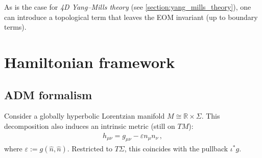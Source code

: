     As is the case for \textit{4D Yang--Mills theory} (see \cref{section:yang_mills_theory}), one can introduce a topological term that leaves the EOM invariant (up to boundary terms).

\section{Hamiltonian framework}\label{section:GR_hamiltonian_framework}
\subsection{ADM formalism}

    Consider a globally hyperbolic Lorentzian manifold $M\cong\mathbb{R}\times\Sigma$. This decomposition also induces an intrinsic metric (still on $TM$):
    \begin{gather*}
        h_{\mu\nu}=g_{\mu\nu} - \varepsilon n_\mu n_\nu\,,
    \end{gather*}
    where $\varepsilon:=g(\widehat{n},\widehat{n})$. Restricted to $T\Sigma$, this coincides with the pullback $\iota^*g$.

